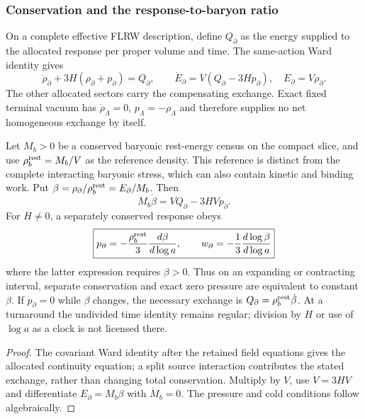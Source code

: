 \documentclass[12pt,a4paper]{article}
\begin{document}
\subsubsection{Conservation and the response-to-baryon ratio}
\begin{theorem}
\label{p8:thm:v2205-ratio-pressure-exchange}
On a complete effective FLRW description, define $Q_\partial$ as the
energy supplied to the allocated response per proper volume and time.
The same-action Ward identity gives
\begin{equation}
\label{p8:eq:v2205-response-continuity}
 \boxed{\dot\rho_\partial+3H(\rho_\partial+p_\partial)
          =Q_\partial,\qquad
 \dot E_\partial=V(Q_\partial-3Hp_\partial),\quad
 E_\partial=V\rho_\partial.}
\end{equation}
The other allocated sectors carry the compensating exchange. Exact fixed
terminal vacuum has $\dot\rho_\Lambda=0$, $p_\Lambda=-\rho_\Lambda$ and
therefore supplies no net homogeneous exchange by itself.

Let $M_b>0$ be a conserved baryonic rest-energy census on the compact
slice, and use $\rho_b^{\rm rest}=M_b/V$ as the reference density.
This reference is distinct from the complete interacting baryonic
stress, which can also contain kinetic and binding work. Put
$\beta=\rho_\partial/\rho_b^{\rm rest}=E_\partial/M_b$.
Then
\begin{equation}
\label{p8:eq:v2205-ratio-pressure-exchange}
 \boxed{M_b\dot\beta=VQ_\partial-3HVp_\partial.}
\end{equation}
For $H\ne0$, a separately conserved response obeys
\begin{equation}
\label{p8:eq:v2205-conserved-ratio-pressure}
 \boxed{p_\partial=-\frac{\rho_b^{\rm rest}}3
             \frac{d\beta}{d\log a},\qquad
 w_\partial=-\frac13\frac{d\log\beta}{d\log a}}
\end{equation}
where the latter expression requires $\beta>0$.
Thus on an expanding or contracting interval, separate conservation and
exact zero pressure are equivalent to constant $\beta$.
If $p_\partial=0$ while $\beta$ changes, the necessary exchange is
$Q_\partial=\rho_b^{\rm rest}\dot\beta$.
At a turnaround the undivided time identity remains regular; division
by $H$ or use of $\log a$ as a clock is not licensed there.
\end{theorem}
\begin{proof}
The covariant Ward identity after the retained field equations gives the
allocated continuity equation; a split source interaction contributes the
stated exchange, rather than changing total conservation. Multiply by
$V$, use $\dot V=3HV$ and differentiate $E_\partial=M_b\beta$ with
$\dot M_b=0$. The pressure and cold conditions follow algebraically.
\end{proof}
\end{document}
